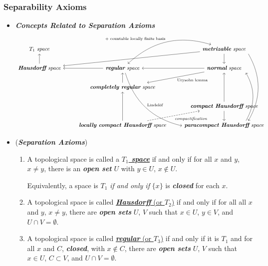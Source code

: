 \documentclass[11pt]{article}
\begin{document}
\subsubsection{Separability Axioms}
\begin{itemize}
\item \emph{\textbf{Concepts Related to Separation Axioms}}
\[
  \begin{tikzcd}
   \text{\emph{\textbf{$T_1$} space}}  & &\arrow{lld}{} \text{\emph{\textbf{metrizable} space}} \arrow{d}{} \arrow[dddd, shift left = 9ex, bend left, ""]  \\
   \arrow{u}{} \text{\emph{\textbf{Hausdorff} space}} &\arrow{l}{} \text{\emph{\textbf{regular} space}} \arrow[ur, leftrightarrow, bend left, "\text{ $+$ countable locally finite basis}"] \arrow[dddr,  bend right,"\text{Lindel\"of}"] &\arrow{l}{} \arrow{dl}{\text{Urysohn lemma}} \text{\emph{\textbf{normal} space}}  \\
  &  \arrow{u}{} \text{\emph{\textbf{completely regular} space}}   &  \\
   & &  \text{\emph{\textbf{compact Hausdorff} space}} \arrow{uu}{} \arrow{d}{} \\
   & \text{\emph{\textbf{locally compact Hausdorff} space}} \arrow{uu}{}  \arrow[dashed, swap]{ur}{\text{\emph{compactification}}} & \text{\emph{\textbf{paracompact Hausdorff} space}} \arrow[bend right, shift right = 8ex]{uuu}{}
  \end{tikzcd}
\] 

\item \begin{definition} (\textbf{\emph{Separation Axioms}})
\begin{enumerate}
\item A topological space is called a \underline{\emph{\textbf{$T_1$ space}}} if and only if for all $x$ and $y$, $x\neq y$, there is an \emph{\textbf{open set}} $U$ with $y \in U$, $x \not\in U$. 

Equivalently, a space is $T_1$ \emph{if and only if} $\{x\}$ is \emph{\textbf{closed}} for each $x$.

\item A topological space is called \underline{\emph{\textbf{Hausdorff}} (or $T_2$)} if and only if for all all $x$ and $y$, $x\neq y$, there are \emph{\textbf{open sets}}  $U$,  $V$ such that $x \in U$, $y \in V$, and $U \cap V = \emptyset$.

\item A topological space is called \underline{\emph{\textbf{regular}} (or $T_3$)} if and only if it is $T_1$ and for all $x$ and $C$, \emph{\textbf{closed}}, with $x \not\in C$, there are \emph{\textbf{open sets}} $U$, $V$ such that $x \in U$, $C \subset V$, and $U \cap V = \emptyset$. 


\end{enumerate}
\end{definition}
\end{itemize}
\end{document}
